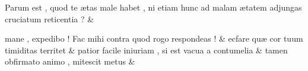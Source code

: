 \documentclass[12pt,onecolumn,twoside,a4paper]{memoir}
\begin{document}
\begin{pairs}
\begin{Leftside}
                              Parum
                              est
                              ,
                              quod
                              te
                              ætas
                              male
                              habet
                              ,
                              ni
                              etiam
                              hunc
                              ad
                              malam
                              ætatem
                              adjungas
                              cruciatum
                              reticentia
                              ? \&
                         \stanza {}
                     
                              mane
                              ,
                              expedibo
                              !
                              Fac
                              mihi
                              contra
                              quod
                              rogo
                              respondeas
                              ! \&
                         \stanza {}
                     ecfare
                              quæ
                              cor
                              tuum
                              timiditas
                              territet \&
                         \stanza {}
                     patior
                              facile
                              iniuriam
                              ,
                              si
                              est
                              vacua
                              a
                              contumelia \&
                         \stanza {}
                     tamen
                              obfirmato
                              animo
                              ,
                              mitescit
                              metus \&
                         \stanza {}
                     

\end{Leftside}
\end{pairs}
\end{document}
